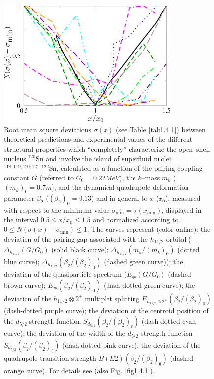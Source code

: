 \begin{figure}
\begin{center}
\includegraphics[width=0.8\textwidth]{introduccion/figs/funnel_norm_tot_try.pdf}
\caption{
Root mean square deviations $\sigma(x)$ (see Table \ref{tab1.4.1}) between theoretical predictions and experimental values of the different structural properties which ``completely'' characterize the open--shell nucleus $^{120}$Sn and involve the island of superfluid nuclei $^{118,119,120,121,122}$Sn, calculated as a function of the pairing coupling constant $G$ (referred to $G_0 = 0.22 MeV$), the $k$--mass $m_k$ ($(m_k)_0 = 0.7 m$), and the dynamical quadrupole deformation parameter $\beta_2$ ($(\beta_{2})_0 = 0.13$)  and in general to $x$ ($x_0$), measured with respect to the minimum value $\sigma_{\textrm{min}} = \sigma (x_{\textrm{min}})$, displayed in the interval $0.5 \leq x/x_0 \leq 1.5$ and normalized according to $0 \leq N(\sigma(x) - \sigma_{\textrm{min}}) \leq 1$.
The  curves represent (color online): the deviation of the  pairing gap associated with the $h_{11/2}$ orbital 
($\Delta_{h_{11/2}} (G/G_0)$ (solid black curve);  
$\Delta_{h_{11/2}} (m_k/(m_k)_0)$ (dotted blue curve);  $\Delta_{h_{11/2}} (\beta_{2}/(\beta_{2})_0)$ (dashed green curve));
the deviation of the quasiparticle spectrum ($E_{qp}(G/G_0)$ (dashed brown curve);  $E_{qp}(\beta_{2}/(\beta_{2})_0)$ (dash-dotted green curve);
the deviation of the $h_{11/2}\otimes 2^+$ multiplet splitting  $E_{h_{11/2}\otimes 2^+}(\beta_{2}/(\beta_{2})_0)$ (dash-dotted purple curve); 
the deviation of the  centroid position of the $d_{5/2}$ strength function $S_{d_{5/2}}(\beta_{2}/(\beta_{2})_0)$ (dash-dotted cyan curve); 
the deviation of the width of the $d_{5/2}$ strength function  $S_{d_{5/2}} (\beta_{2}/(\beta_{2})_0)$ (dash-dotted pink curve);
the deviation  of the  quadrupole transition strength  $B(E2) (\beta_{2}/(\beta_{2})_0)$ (dashed orange curve). For details see \cite{Idini:15} (also Fig. \ref{fig1.4.1}).
}
\end{center}
\end{figure}
